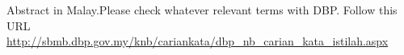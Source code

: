 \begin{abstrak}
Abstract in Malay.Please check whatever relevant terms with DBP.
Follow this URL
\url{http://sbmb.dbp.gov.my/knb/cariankata/dbp_nb_carian_kata_istilah.aspx}

\end{abstrak}
